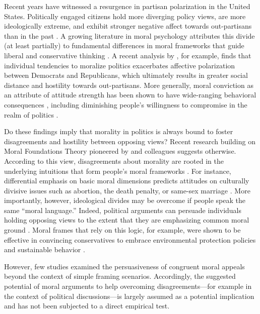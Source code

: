 Recent years have witnessed a resurgence in partisan polarization in the United States. Politically engaged citizens hold more diverging policy
views, are more ideologically extreme, and exhibit stronger negative affect towards out-partisans than in the past \citep{hetherington2001resurgent, abramowitz2008polarization, iyengar2012affect, mason2014disrespectfully, huddy2015expressive, iyengar2015fear}. A growing literature in moral psychology attributes this divide (at least partially) to fundamental differences in moral frameworks that guide liberal and conservative thinking \citep[e.g.,][]{haidt2012righteous,graham2013moral}. A recent analysis by \citet{garrett2018moral}, for example, finds that individual tendencies to moralize politics exacerbates affective polarization between Democrats and Republicans, which ultimately results in greater social distance and hostility towards out-partisans. More generally, moral conviction as an attribute of attitude strength has been shown to have wide-ranging behavioral consequences \citep{skitka2005moral,skitka2014social}, including diminishing people's willingness to compromise in the realm of politics \citep{ryan2014reconsidering,ryan2017no}.

Do these findings imply that morality in politics is always bound to foster disagreements and hostility between opposing views? Recent research building on Moral Foundations Theory pioneered by \citet{haidt2007new} and colleagues suggests otherwise. According to this view, disagreements about morality are rooted in the underlying intuitions that form people's moral frameworks \citep{haidt2012righteous}. For instance, differential emphasis on basic moral dimensions predicts attitudes on culturally divisive issues such as abortion, the death penalty, or same-sex marriage \citep{koleva2012tracing}. More importantly, however, ideological divides may be overcome if people speak the same ``moral language.'' Indeed, political arguments can persuade individuals holding opposing views to the extent that they are emphasizing common moral ground \citep[e.g.,][]{day2014shifting,feinberg2015gulf}. Moral frames that rely on this logic, for example, were shown to be effective in convincing conservatives to embrace environmental protection policies and sustainable behavior \citep{kidwell2013getting,feinberg2013moral}.

However, few studies examined the persuasiveness of congruent moral appeals beyond the context of simple framing scenarios. Accordingly, the suggested potential of moral arguments to help overcoming disagreements---for example in the context of political discussions---is largely assumed as a potential implication and has not been subjected to a direct empirical test.

